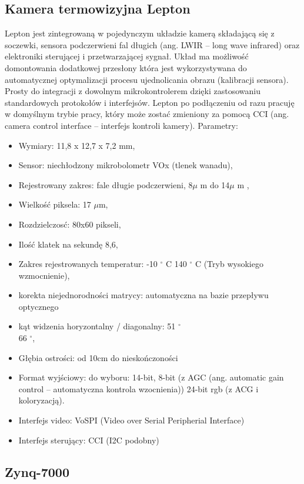 \subsection{Kamera termowizyjna Lepton} 
Lepton jest zintegrowaną w pojedynczym układzie kamerą składającą się z soczewki, sensora podczerwieni fal długich (ang. LWIR – long wave infrared) oraz elektroniki sterującej i przetwarzającej sygnał.  Układ ma możliwość domontowania dodatkowej przesłony która jest wykorzystywana do automatycznej optymalizacji procesu ujednolicania obrazu (kalibracji sensora).
Prosty do integracji z dowolnym mikrokontrolerem dzięki zastosowaniu standardowych protokołów i interfejsów. Lepton po podłączeniu od razu pracuję w domyślnym trybie pracy, który może zostać zmieniony za pomocą CCI (ang. camera control interface – interfejs kontroli kamery).\cite{lepton}
Parametry:
\begin{itemize}
\item Wymiary: 11,8 x 12,7 x 7,2 mm, 
\item Sensor: niechłodzony mikrobolometr VOx (tlenek wanadu),
\item Rejestrowany zakres: fale długie podczerwieni, 8$\mu$ m do 14$\mu$ m ,
\item Wielkość piksela: 17 $\mu$m,
\item Rozdzielczosć: 80x60 pikseli,
\item Ilość klatek na sekundę 8,6,
\item Zakres rejestrowanych temperatur: -10  $^\circ$  C 140  $^\circ$  C (Tryb wysokiego wzmocnienie),
\item korekta niejednorodności matrycy: automatyczna na bazie przepływu optycznego
\item kąt widzenia horyzontalny / diagonalny: 51 $^\circ$ \\ 66 $^\circ$,
\item Głębia ostrości: od 10cm do nieskończoności
\item Format wyjściowy: do wyboru: 14-bit, 8-bit (z AGC (ang. automatic gain control – automatyczna kontrola wzocnienia)) 24-bit rgb (z ACG i koloryzacją).
\item Interfejs video: VoSPI (Video over Serial Peripherial Interface)
\item Interfejs sterujący: CCI (I2C podobny)
\end{itemize}
\subsection{Zynq-7000}

